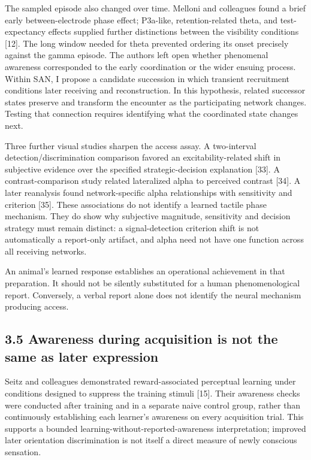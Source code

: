 \documentclass[
  american,
  11pt,
  letterpaper,
]{article}
\begin{document}
The sampled episode also changed over time. Melloni and colleagues found a brief early between-electrode phase effect; P3a-like, retention-related theta, and test-expectancy effects supplied further distinctions between the visibility conditions {[}12{]}. The long window needed for theta prevented ordering its onset precisely against the gamma episode. The authors left open whether phenomenal awareness corresponded to the early coordination or the wider ensuing process. Within SAN, I propose a candidate succession in which transient recruitment conditions later receiving and reconstruction. In this hypothesis, related successor states preserve and transform the encounter as the participating network changes. Testing that connection requires identifying what the coordinated state changes next.

Three further visual studies sharpen the access assay. A two-interval detection/discrimination comparison favored an excitability-related shift in subjective evidence over the specified strategic-decision explanation {[}33{]}. A contrast-comparison study related lateralized alpha to perceived contrast {[}34{]}. A later reanalysis found network-specific alpha relationships with sensitivity and criterion {[}35{]}. These associations do not identify a learned tactile phase mechanism. They do show why subjective magnitude, sensitivity and decision strategy must remain distinct: a signal-detection criterion shift is not automatically a report-only artifact, and alpha need not have one function across all receiving networks.

An animal's learned response establishes an operational achievement in that preparation. It should not be silently substituted for a human phenomenological report. Conversely, a verbal report alone does not identify the neural mechanism producing access.

\subsection{3.5 Awareness during acquisition is not the same as later expression}\label{awareness-during-acquisition-is-not-the-same-as-later-expression}

Seitz and colleagues demonstrated reward-associated perceptual learning under conditions designed to suppress the training stimuli {[}15{]}. Their awareness checks were conducted after training and in a separate naive control group, rather than continuously establishing each learner's awareness on every acquisition trial. This supports a bounded learning-without-reported-awareness interpretation; improved later orientation discrimination is not itself a direct measure of newly conscious sensation.
\end{document}

